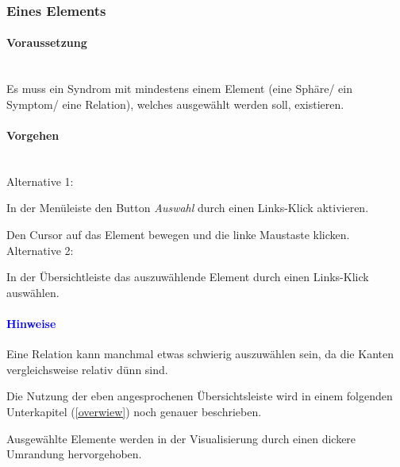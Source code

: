 \documentclass[enabledeprecatedfontcommands,fontsize=11pt,paper=a4,twoside]{scrartcl}
\newcounter{one}
\newcounter{two}[one]
\newcommand*{\hint}{\paragraph{\textcolor{blue}{Hinweise}}}
\newcommand*{\condition}{\paragraph{Voraussetzung}$\;$ \vspace{0.2cm}\\}
\newcommand*{\actions}{\paragraph{Vorgehen} $\;$\vspace{0.2cm}\\}
\newcommand*{\aOne}{\textcolor{bbe}{Alternative 1:}}
\newcommand*{\aTwo}{\textcolor{bbe}{Alternative 2:}}
\let\tempone\itemize
\let\temptwo\enditemize
\renewenvironment{itemize}{\tempone\addtolength{\itemsep}{-10.0pt}}{\temptwo}
\let\origenumerate\enumerate
\let\origendenumerate\endenumerate
\renewenvironment{enumerate}{\origenumerate \addtolength{\itemsep}{-10.0pt}}{\origendenumerate}
\begin{document}
	\subsubsection{Eines Elements}
	\condition
	Es muss ein Syndrom mit mindestens einem Element (eine Sphäre/ ein Symptom/ eine Relation), welches ausgewählt werden soll, existieren. 
	\actions
	\aOne 
	\begin{enumerate}
		\item In der Menüleiste den Button \textit{Auswahl} durch einen Links-Klick aktivieren. 
		\item Den Cursor auf das Element bewegen und die linke Maustaste klicken. 
	\end{enumerate}
	\aTwo
	\begin{enumerate}
		\item In der Übersichtleiste das auszuwählende Element durch einen Links-Klick auswählen. 
	\end{enumerate}
	\hint
	\begin{itemize}
		\item Eine Relation kann manchmal etwas schwierig auszuwählen sein, da die Kanten vergleichsweise relativ dünn sind. 
		\item Die Nutzung der eben angesprochenen Übersichtsleiste wird in einem folgenden Unterkapitel (\ref{overwiew}) noch genauer beschrieben.
		\item Ausgewählte Elemente werden in der Visualisierung durch einen dickere Umrandung hervorgehoben.
	\end{itemize}
	
	\begin{figure}[ht!]
		\centering
		
	\end{figure}	
	
\end{document}
